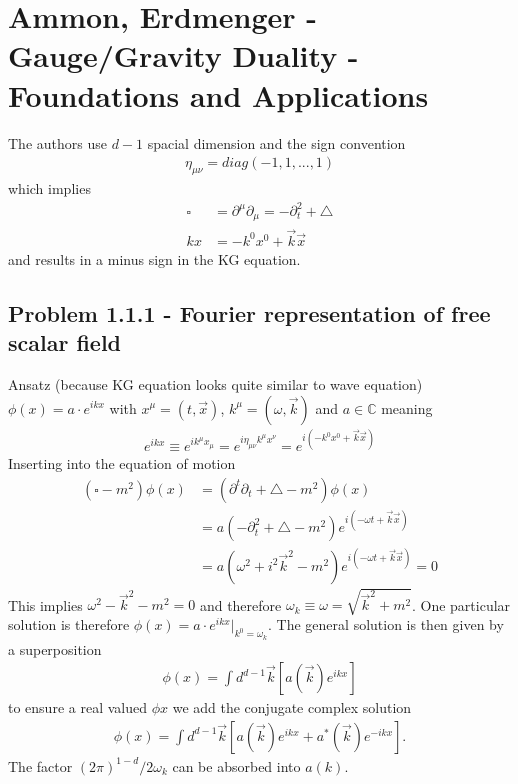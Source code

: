 \documentclass[10pt,a4paper]{book}
\theoremstyle{definition}
\begin{document}
\section{{\sc Ammon, Erdmenger} - Gauge/Gravity Duality - Foundations and Applications}
The authors use $d-1$ spacial dimension and the sign convention 
\begin{align}
\eta_{\mu\nu}=diag(-1,1,...,1)
\end{align}
which implies 
\begin{align}
    \square&=\partial^\mu\partial_\mu=-\partial_t^2+\triangle\\
    kx&=-k^0x^0+\vec{k}\vec{x}
\end{align}
and results in a minus sign in the KG equation.

\subsection{Problem 1.1.1 - Fourier representation of free scalar field}
Ansatz (because KG equation looks quite similar to wave equation) $\phi(x)=a\cdot e^{ikx}$ with $x^\mu=(t,\vec{x})$, $k^\mu=(\omega,\vec{k})$ and $a\in\mathbb{C}$ meaning 
\begin{align}
    e^{ikx}\equiv e^{ik^{\mu}x_{\mu}}=e^{i\eta_{\mu\nu}k^{\mu}x^{\nu}}=e^{i(-k^0x^0+\vec{k}\vec{x})}
\end{align}
Inserting into the equation of motion
\begin{align}
    (\square - m^2)\phi(x)&=(\partial^t\partial_t + \triangle - m^2)\phi(x)\\
    &=a(-\partial_t^2 + \triangle - m^2)e^{i(-\omega t+\vec{k}\vec{x})}\\
    &=a\left(\omega^2 + i^2\vec{k}^2 - m^2\right)e^{i(-\omega t+\vec{k}\vec{x})}=0 
\end{align}
This implies $\omega^2-\vec{k}^2-m^2=0$ and therefore $\omega_k\equiv\omega=\sqrt{\vec{k}^2+m^2}$. One particular solution is therefore $\phi(x)=a\cdot e^{ikx}|_{k^0=\omega_k}$. The general solution is then given by a superposition
\begin{align}
    \phi(x)=\int d^{d-1}\vec{k}\left[a(\vec{k})e^{ikx}\right]
\end{align}
to ensure a real valued $\phi{x}$ we add the conjugate complex solution
\begin{align}
    \phi(x)=\int d^{d-1}\vec{k}\left[a(\vec{k})e^{ikx} + a^*(\vec{k})e^{-ikx}\right].
\end{align}
The factor $(2\pi)^{1-d}/2\omega_k$ can be absorbed into $a(k)$.
\end{document}
